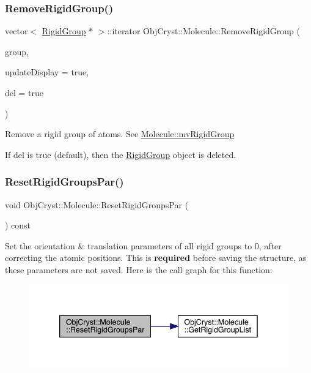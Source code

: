 \subsubsection{\texorpdfstring{RemoveRigidGroup()}{RemoveRigidGroup()}}
{\footnotesize\ttfamily vector$<$ \mbox{\hyperlink{class_obj_cryst_1_1_rigid_group}{Rigid\+Group}} $\ast$ $>$\+::iterator Obj\+Cryst\+::\+Molecule\+::\+Remove\+Rigid\+Group (\begin{DoxyParamCaption}\item[{const \mbox{\hyperlink{class_obj_cryst_1_1_rigid_group}{Rigid\+Group}} \&}]{group,  }\item[{const bool}]{update\+Display = {\ttfamily true},  }\item[{const bool}]{del = {\ttfamily true} }\end{DoxyParamCaption})}

Remove a rigid group of atoms. See \mbox{\hyperlink{class_obj_cryst_1_1_molecule_a43939b3e3ad83065cf7ccb6065a53a12}{Molecule\+::mv\+Rigid\+Group}}

If del is true (default), then the \mbox{\hyperlink{class_obj_cryst_1_1_rigid_group}{Rigid\+Group}} object is deleted. \mbox{\label{class_obj_cryst_1_1_molecule_aacd7668d81ffb43a889d6da6e07cde9b}} 
\subsubsection{\texorpdfstring{ResetRigidGroupsPar()}{ResetRigidGroupsPar()}}
{\footnotesize\ttfamily void Obj\+Cryst\+::\+Molecule\+::\+Reset\+Rigid\+Groups\+Par (\begin{DoxyParamCaption}{ }\end{DoxyParamCaption}) const}

Set the orientation \& translation parameters of all rigid groups to 0, after correcting the atomic positions. This is {\bfseries{required}} before saving the structure, as these parameters are not saved. Here is the call graph for this function\+:
\nopagebreak
\begin{figure}[H]
\begin{center}
\leavevmode
\includegraphics[width=339pt]{class_obj_cryst_1_1_molecule_aacd7668d81ffb43a889d6da6e07cde9b_cgraph}
\end{center}
\end{figure}
\mbox{\label{class_obj_cryst_1_1_molecule_a560c9ffc36d4874b99eb26c198ee485f}} 
